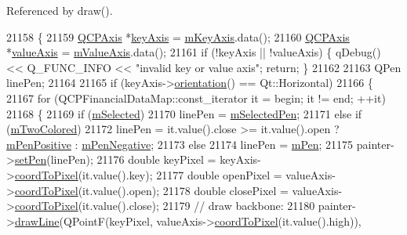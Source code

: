 Referenced by draw().


\begin{DoxyCode}
21158 \{
21159   \hyperlink{class_q_c_p_axis}{QCPAxis} *\hyperlink{class_q_c_p_abstract_plottable_a72c7a09c22963f2c943f07112b311103}{keyAxis} = \hyperlink{class_q_c_p_abstract_plottable_a426f42e254d0f8ce5436a868c61a6827}{mKeyAxis}.data();
21160   \hyperlink{class_q_c_p_axis}{QCPAxis} *\hyperlink{class_q_c_p_abstract_plottable_a3106f9d34d330a6097a8ec5905e5b519}{valueAxis} = \hyperlink{class_q_c_p_abstract_plottable_a2901452ca4aea911a1827717934a4bda}{mValueAxis}.data();
21161   \textcolor{keywordflow}{if} (!keyAxis || !valueAxis) \{ qDebug() << Q\_FUNC\_INFO << \textcolor{stringliteral}{"invalid key or value axis"}; \textcolor{keywordflow}{return}; \}
21162   
21163   QPen linePen;
21164   
21165   \textcolor{keywordflow}{if} (keyAxis->\hyperlink{class_q_c_p_axis_a57483f2f60145ddc9e63f3af53959265}{orientation}() == Qt::Horizontal)
21166   \{
21167     \textcolor{keywordflow}{for} (QCPFinancialDataMap::const\_iterator it = begin; it != end; ++it)
21168     \{
21169       \textcolor{keywordflow}{if} (\hyperlink{class_q_c_p_abstract_plottable_a43f68a0603e9bcd016bdfa6d9d5c41c9}{mSelected})
21170         linePen = \hyperlink{class_q_c_p_abstract_plottable_a10619472f5d5e10e9519a599f1cf5576}{mSelectedPen};
21171       \textcolor{keywordflow}{else} \textcolor{keywordflow}{if} (\hyperlink{class_q_c_p_financial_a6afe919190b884d9bac026cefcc8c0a8}{mTwoColored})
21172         linePen = it.value().close >= it.value().open ? \hyperlink{class_q_c_p_financial_aa6599186f417ba615caebb3f6c762bd8}{mPenPositive} : 
      \hyperlink{class_q_c_p_financial_a263fbfefde2cc19c8d4024a8319c2bbb}{mPenNegative};
21173       \textcolor{keywordflow}{else}
21174         linePen = \hyperlink{class_q_c_p_abstract_plottable_a67bc0622fd1b9fa14e54c14922dcec66}{mPen};
21175       painter->\hyperlink{class_q_c_p_painter_af9c7a4cd1791403901f8c5b82a150195}{setPen}(linePen);
21176       \textcolor{keywordtype}{double} keyPixel = keyAxis->\hyperlink{class_q_c_p_axis_a985ae693b842fb0422b4390fe36d299a}{coordToPixel}(it.value().key);
21177       \textcolor{keywordtype}{double} openPixel = valueAxis->\hyperlink{class_q_c_p_axis_a985ae693b842fb0422b4390fe36d299a}{coordToPixel}(it.value().open);
21178       \textcolor{keywordtype}{double} closePixel = valueAxis->\hyperlink{class_q_c_p_axis_a985ae693b842fb0422b4390fe36d299a}{coordToPixel}(it.value().close);
21179       \textcolor{comment}{// draw backbone:}
21180       painter->\hyperlink{class_q_c_p_painter_a0b4b1b9bd495e182c731774dc800e6e0}{drawLine}(QPointF(keyPixel, valueAxis->\hyperlink{class_q_c_p_axis_a985ae693b842fb0422b4390fe36d299a}{coordToPixel}(it.value().high)), 

\end{DoxyCode}
